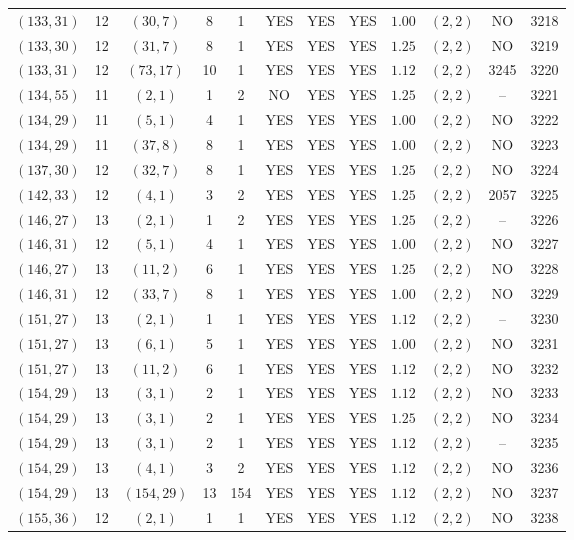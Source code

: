 \begin{longtable}{|c|c|c|c|c|c|c|c|c|c|c|c|}
$(133,31)$ & 12 & $(30,7)$ & 8 & 1 & YES & YES & YES & $1.00$ & $(2,2)$ & NO & 3218\\
$(133,30)$ & 12 & $(31,7)$ & 8 & 1 & YES & YES & YES & $1.25$ & $(2,2)$ & NO & 3219\\
$(133,31)$ & 12 & $(73,17)$ & 10 & 1 & YES & YES & YES & $1.12$ & $(2,2)$ & 3245 & 3220\\
$(134,55)$ & 11 & $(2,1)$ & 1 & 2 & NO & YES & YES & $1.25$ & $(2,2)$ & -- & 3221\\
$(134,29)$ & 11 & $(5,1)$ & 4 & 1 & YES & YES & YES & $1.00$ & $(2,2)$ & NO & 3222\\
$(134,29)$ & 11 & $(37,8)$ & 8 & 1 & YES & YES & YES & $1.00$ & $(2,2)$ & NO & 3223\\
$(137,30)$ & 12 & $(32,7)$ & 8 & 1 & YES & YES & YES & $1.25$ & $(2,2)$ & NO & 3224\\
$(142,33)$ & 12 & $(4,1)$ & 3 & 2 & YES & YES & YES & $1.25$ & $(2,2)$ & 2057 & 3225\\
$(146,27)$ & 13 & $(2,1)$ & 1 & 2 & YES & YES & YES & $1.25$ & $(2,2)$ & -- & 3226\\
$(146,31)$ & 12 & $(5,1)$ & 4 & 1 & YES & YES & YES & $1.00$ & $(2,2)$ & NO & 3227\\
$(146,27)$ & 13 & $(11,2)$ & 6 & 1 & YES & YES & YES & $1.25$ & $(2,2)$ & NO & 3228\\
$(146,31)$ & 12 & $(33,7)$ & 8 & 1 & YES & YES & YES & $1.00$ & $(2,2)$ & NO & 3229\\
$(151,27)$ & 13 & $(2,1)$ & 1 & 1 & YES & YES & YES & $1.12$ & $(2,2)$ & -- & 3230\\
$(151,27)$ & 13 & $(6,1)$ & 5 & 1 & YES & YES & YES & $1.00$ & $(2,2)$ & NO & 3231\\
$(151,27)$ & 13 & $(11,2)$ & 6 & 1 & YES & YES & YES & $1.12$ & $(2,2)$ & NO & 3232\\
$(154,29)$ & 13 & $(3,1)$ & 2 & 1 & YES & YES & YES & $1.12$ & $(2,2)$ & NO & 3233\\
$(154,29)$ & 13 & $(3,1)$ & 2 & 1 & YES & YES & YES & $1.25$ & $(2,2)$ & NO & 3234\\
$(154,29)$ & 13 & $(3,1)$ & 2 & 1 & YES & YES & YES & $1.12$ & $(2,2)$ & -- & 3235\\
$(154,29)$ & 13 & $(4,1)$ & 3 & 2 & YES & YES & YES & $1.12$ & $(2,2)$ & NO & 3236\\
$(154,29)$ & 13 & $(154,29)$ & 13 & 154 & YES & YES & YES & $1.12$ & $(2,2)$ & NO & 3237\\
$(155,36)$ & 12 & $(2,1)$ & 1 & 1 & YES & YES & YES & $1.12$ & $(2,2)$ & NO & 3238\\

\end{longtable}

